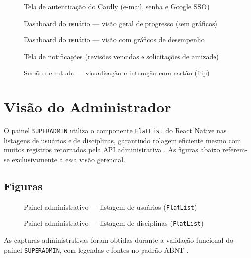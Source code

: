 \begin{figure}[htb]
\centering
{}
\caption{Tela de autenticação do Cardly (e-mail, senha e Google SSO)}
\label{fig:login}
\end{figure}

\begin{figure}[htb]
\centering
{}
\caption{Dashboard do usuário --- visão geral de progresso (sem gráficos)}
\label{fig:dashboard}
\end{figure}

\begin{figure}[htb]
\centering
{}
\caption{Dashboard do usuário --- visão com gráficos de desempenho}
\label{fig:dashboard-charts}
\end{figure}

\begin{figure}[htb]
\centering
{}
\caption{Tela de notificações (revisões vencidas e solicitações de amizade)}
\label{fig:notifications}
\end{figure}

\begin{figure}[htb]
\centering
{}
\caption{Sessão de estudo --- visualização e interação com cartão (flip)}
\label{fig:card-view}
\end{figure}

\section{Visão do Administrador}

O painel \texttt{SUPERADMIN} utiliza o componente \texttt{FlatList} do React Native nas listagens de usuários e de disciplinas, garantindo rolagem eficiente mesmo com muitos registros retornados pela API administrativa \cite{react_native_docs}. As figuras abaixo referem-se exclusivamente a essa visão gerencial.

\subsection{Figuras}

\begin{figure}[htb]
\centering
{}
\caption{Painel administrativo --- listagem de usuários (\texttt{FlatList})}
\label{fig:admin-users}
\end{figure}

\begin{figure}[htb]
\centering
{}
\caption{Painel administrativo --- listagem de disciplinas (\texttt{FlatList})}
\label{fig:admin-subjects}
\end{figure}

As capturas administrativas foram obtidas durante a validação funcional do painel \texttt{SUPERADMIN}, com legendas e fontes no padrão ABNT \cite{abnt_nbr14724}.

